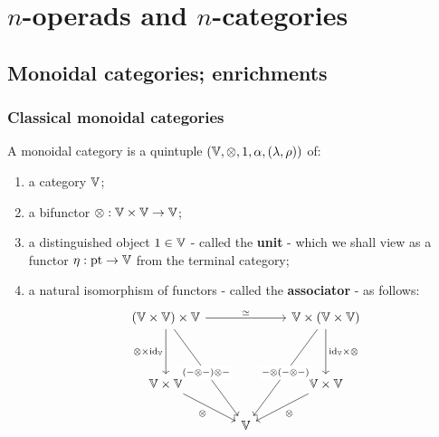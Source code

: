 \section{\texorpdfstring{$n$}{}-operads and \texorpdfstring{$n$}{}-categories}
    \subsection{Monoidal categories; enrichments}
        \subsubsection{Classical monoidal categories}
            \begin{definition} \label{def: monoidal_categories} 
                A monoidal category is a quintuple $(\V, \tensor, 1, \alpha, (\lambda, \rho))$ of:
                    \begin{enumerate}
                        \item a category $\V$;
                        \item a bifunctor $\tensor: \V \x \V \to \V$;
                        \item a distinguished object $1 \in \V$ - called the \textbf{unit} - which we shall view as a functor $\eta: \pt \to \V$ from the terminal category;
                        \item a natural isomorphism of functors - called the \textbf{associator} - as follows:
                            $$
                                \begin{tikzcd}
                                	{(\V \x \V) \x \V} && {\V \x (\V \x \V)} \\
                                	\\
                                	{\V \x \V} && {\V \x \V} \\
                                	& \V
                                	\arrow["{\tensor \x \id_{\V}}"', from=1-1, to=3-1]
                                	\arrow["\tensor"', from=3-1, to=4-2]
                                	\arrow["\tensor", from=3-3, to=4-2]
                                	\arrow["{\id_{\V} \x \tensor }", from=1-3, to=3-3]
                                	\arrow["\cong", from=1-1, to=1-3]
                                	\arrow[""{name=0, anchor=center, inner sep=0}, "{(- \tensor -) \tensor -}"{description}, from=1-1, to=4-2]
                                	\arrow[""{name=1, anchor=center, inner sep=0}, "{- \tensor (- \tensor -)}"{description}, from=1-3, to=4-2]

\end{tikzcd}$$
\end{enumerate}
\end{definition}

